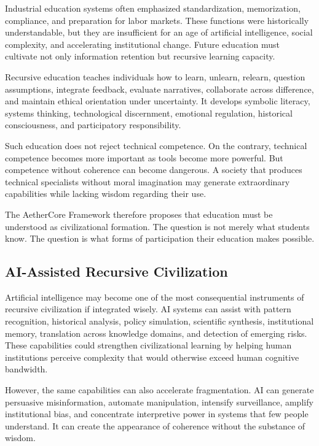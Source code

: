 \documentclass[12pt]{article}
\begin{document}
Industrial education systems often emphasized standardization, memorization, compliance, and preparation for labor markets. These functions were historically understandable, but they are insufficient for an age of artificial intelligence, social complexity, and accelerating institutional change. Future education must cultivate not only information retention but recursive learning capacity.

Recursive education teaches individuals how to learn, unlearn, relearn, question assumptions, integrate feedback, evaluate narratives, collaborate across difference, and maintain ethical orientation under uncertainty. It develops symbolic literacy, systems thinking, technological discernment, emotional regulation, historical consciousness, and participatory responsibility.

Such education does not reject technical competence. On the contrary, technical competence becomes more important as tools become more powerful. But competence without coherence can become dangerous. A society that produces technical specialists without moral imagination may generate extraordinary capabilities while lacking wisdom regarding their use.

The AetherCore Framework therefore proposes that education must be understood as civilizational formation. The question is not merely what students know. The question is what forms of participation their education makes possible.

\subsection{AI-Assisted Recursive Civilization}

Artificial intelligence may become one of the most consequential instruments of recursive civilization if integrated wisely. AI systems can assist with pattern recognition, historical analysis, policy simulation, scientific synthesis, institutional memory, translation across knowledge domains, and detection of emerging risks. These capabilities could strengthen civilizational learning by helping human institutions perceive complexity that would otherwise exceed human cognitive bandwidth.

However, the same capabilities can also accelerate fragmentation. AI can generate persuasive misinformation, automate manipulation, intensify surveillance, amplify institutional bias, and concentrate interpretive power in systems that few people understand. It can create the appearance of coherence without the substance of wisdom.
\end{document}
